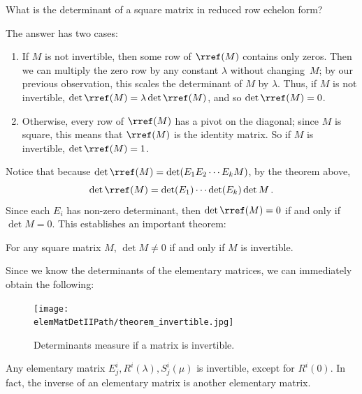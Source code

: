 \begin{center}
What is the determinant of a square matrix in reduced row echelon form?  
\end{center}
The answer has two cases:
\begin{enumerate}
\item If $M$ is not invertible, then some row of $\rref(M)$ contains only zeros.  Then we can multiply the zero row by any constant $\lambda$ without changing~$M$; by our previous observation, this scales the determinant of $M$ by $\lambda$.  Thus, if $M$ is not invertible, $\det \rref(M)=\lambda \det \rref(M)$, and so $\det \rref(M)=0$.  

\item Otherwise, every row of $\rref(M)$ has a pivot on the diagonal; since $M$ is square, this means that $\rref(M)$ is the identity matrix.  So if $M$ is invertible, $\det \rref(M)=1$.
\end{enumerate}
Notice that because $\det \rref(M) = \det (E_1E_2\cdots E_kM)$, by the theorem above, \[\det \rref(M)=\det (E_1) \cdots \det (E_k) \det M\, .\]  Since each $E_i$ has non-zero determinant, then $\det \rref(M)=0$ if and only if $\det M=0$.
This establishes an important theorem:


\begin{theorem}
\label{detinvertible}
For any square matrix $M$, $\det M\neq 0$ if and only if $M$ is invertible.
\end{theorem}
Since we know the determinants of the elementary matrices, we can immediately obtain the following:



\begin{figure}
\begin{center}
\texttt{[image: \\elemMatDetIIPath/theorem\_invertible.jpg]}
\end{center}
\caption{Determinants measure if a matrix is invertible.}
\end{figure}

\begin{corollary}
Any elementary matrix $E^i_j, R^i(\lambda), S^i_j(\mu)$ is invertible, except for $R^i(0)$.  In fact, the inverse of an elementary matrix is another elementary matrix.
\end{corollary}



